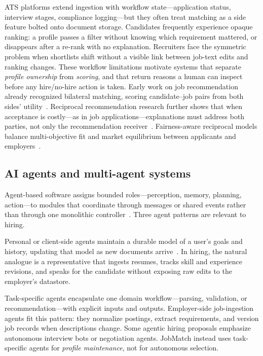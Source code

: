 ATS platforms extend ingestion with workflow state---application status, interview stages, compliance logging---but they often treat matching as a side feature bolted onto document storage.
Candidates frequently experience opaque ranking: a profile passes a filter without knowing which requirement mattered, or disappears after a re-rank with no explanation.
Recruiters face the symmetric problem when shortlists shift without a visible link between job-text edits and ranking changes.
These workflow limitations motivate systems that separate \emph{profile ownership} from \emph{scoring}, and that return reasons a human can inspect before any hire/no-hire action is taken.
Early work on job recommendation already recognized bilateral matching, scoring candidate--job pairs from both sides' utility~\cite{Malinowski2006Jobs}.
Reciprocal recommendation research further shows that when acceptance is costly---as in job applications---explanations must address both parties, not only the recommendation receiver~\cite{Kleinerman2018Reciprocal}.
Fairness-aware reciprocal models balance multi-objective fit and market equilibrium between applicants and employers~\cite{Xia2019WERec}.

\subsection{AI agents and multi-agent systems}\label{sec:2-agents}

Agent-based software assigns bounded roles---perception, memory, planning, action---to modules that coordinate through messages or shared events rather than through one monolithic controller~\cite{Wooldridge2009}.
Three agent patterns are relevant to hiring.

Personal or client-side agents maintain a durable model of a user's goals and history, updating that model as new documents arrive~\cite{Wooldridge2009}.
In hiring, the natural analogue is a representative that ingests resumes, tracks skill and experience revisions, and speaks for the candidate without exposing raw edits to the employer's datastore.

Task-specific agents encapsulate one domain workflow---parsing, validation, or recommendation---with explicit inputs and outputs.
Employer-side job-ingestion agents fit this pattern: they normalize postings, extract requirements, and version job records when descriptions change.
Some agentic hiring proposals emphasize autonomous interview bots or negotiation agents.
JobMatch instead uses task-specific agents for \emph{profile maintenance}, not for autonomous selection.

